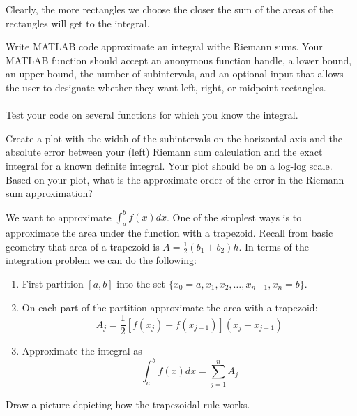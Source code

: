 Clearly, the more rectangles we choose the closer the sum of the areas of the rectangles will get to the integral.
\begin{problem}
    Write MATLAB code approximate an integral withe Riemann sums.  Your MATLAB function
    should accept an anonymous function handle, a lower bound, an upper bound, the number
    of subintervals, and an optional input that allows the user to designate whether they
    want left, right, or midpoint rectangles. \\
     \\
    Test your code on several functions for which you know the integral.
\end{problem}

\begin{problem}
    Create a plot with the width of the subintervals on the horizontal axis and the
    absolute error between your (left) Riemann sum calculation and the exact integral for
    a known definite integral.  Your plot should be on a log-log scale.  Based on your
    plot, what is the approximate order of the error in the Riemann sum approximation?
\end{problem}

\begin{problem}
    We want to approximate $\displaystyle \int_a^b f(x) dx$.  One of the simplest ways is
    to approximate the area under the function with a trapezoid.  Recall from basic
    geometry that area of a
    trapezoid is $A = \frac{1}{2} (b_1 + b_2) h$.  In terms of the integration problem we
    can do the following:
    \begin{enumerate}
        \item First partition $[a,b]$ into the set $\{x_0=a, x_1, x_2, \ldots, x_{n-1},
        x_n=b\}$.
        \item On each part of the partition approximate the area with a trapezoid:
            \[ A_j = \frac{1}{2} \left[ f(x_j) + f(x_{j-1}) \right]\left(
            x_j - x_{j-1} \right) \]
        \item Approximate the integral as
            \[ \int_a^b f(x) dx = \sum_{j=1}^n A_j \]
    \end{enumerate}
    Draw a picture depicting how the trapezoidal rule works.
\end{problem}

